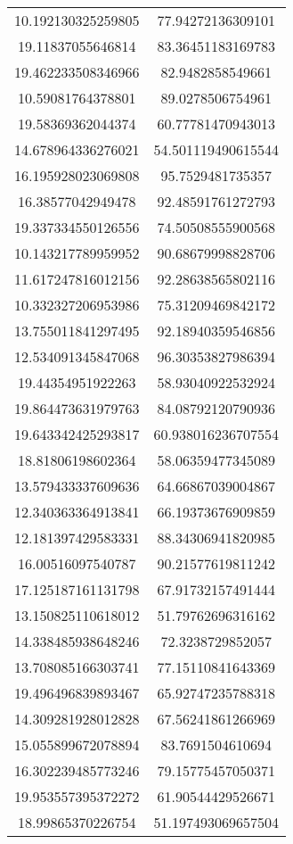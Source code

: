\begin{table}
\begin{tabular}{cc}
10.192130325259805 & 77.94272136309101 \\
19.11837055646814 & 83.36451183169783 \\
19.462233508346966 & 82.9482858549661 \\
10.59081764378801 & 89.0278506754961 \\
19.58369362044374 & 60.77781470943013 \\
14.678964336276021 & 54.501119490615544 \\
16.195928023069808 & 95.7529481735357 \\
16.38577042949478 & 92.48591761272793 \\
19.337334550126556 & 74.50508555900568 \\
10.143217789959952 & 90.68679998828706 \\
11.617247816012156 & 92.28638565802116 \\
10.332327206953986 & 75.31209469842172 \\
13.755011841297495 & 92.18940359546856 \\
12.534091345847068 & 96.30353827986394 \\
19.44354951922263 & 58.93040922532924 \\
19.864473631979763 & 84.08792120790936 \\
19.643342425293817 & 60.938016236707554 \\
18.81806198602364 & 58.06359477345089 \\
13.579433337609636 & 64.66867039004867 \\
12.340363364913841 & 66.19373676909859 \\
12.181397429583331 & 88.34306941820985 \\
16.00516097540787 & 90.21577619811242 \\
17.125187161131798 & 67.91732157491444 \\
13.150825110618012 & 51.79762696316162 \\
14.338485938648246 & 72.3238729852057 \\
13.708085166303741 & 77.15110841643369 \\
19.496496839893467 & 65.92747235788318 \\
14.309281928012828 & 67.56241861266969 \\
15.055899672078894 & 83.7691504610694 \\
16.302239485773246 & 79.15775457050371 \\
19.953557395372272 & 61.90544429526671 \\
18.99865370226754 & 51.197493069657504 \\

\end{tabular}
\end{table}
